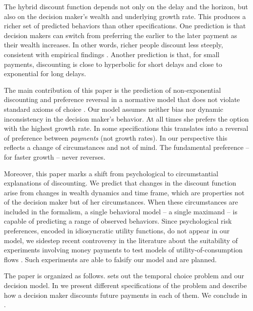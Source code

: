 The hybrid discount function depends not only on the delay and the horizon, but also on the decision maker's wealth and underlying growth rate. This produces a richer set of predicted behaviors than other specifications. One prediction is that decision makers can switch from preferring the earlier to the later payment as their wealth increases. In other words, richer people discount less steeply, consistent with empirical findings \citep{GreenETAL1996,EpperETAL2018}. Another prediction is that, for small payments, discounting is close to hyperbolic for short delays and close to exponential for long delays.

The main contribution of this paper is the prediction of non-exponential discounting and preference reversal in a normative model that does not violate standard axioms of choice \citep{vonNeumannMorgenstern1944}. Our model assumes neither bias nor dynamic inconsistency \citep[p.~3]{CohenETAL2019} in the decision maker's behavior. At all times she prefers the option with the highest growth rate. In some specifications this translates into a reversal of preference between {\it payments} (not growth rates). In our perspective this reflects a change of circumstances and not of mind. The fundamental preference -- for faster growth -- never reverses.

Moreover, this paper marks a shift from psychological to circumstantial explanations of discounting. We predict that changes in the discount function arise from changes in wealth dynamics and time frame, which are properties not of the decision maker but of her circumstances. When these circumstances are included in the formalism, a single behavioral model -- a single maximand -- is capable of predicting a range of observed behaviors. Since psychological risk preferences, encoded in idiosyncratic utility functions, do not appear in our model, we sidestep recent controversy in the literature about the suitability of experiments involving money payments to test models of utility-of-consumption flows \citep{CohenETAL2019}. Such experiments are able to falsify our model and are planned.

The paper is organized as follows.  sets out the temporal choice problem and our decision model. In  we present different specifications of the problem and describe how a decision maker discounts future payments in each of them. We conclude in .


